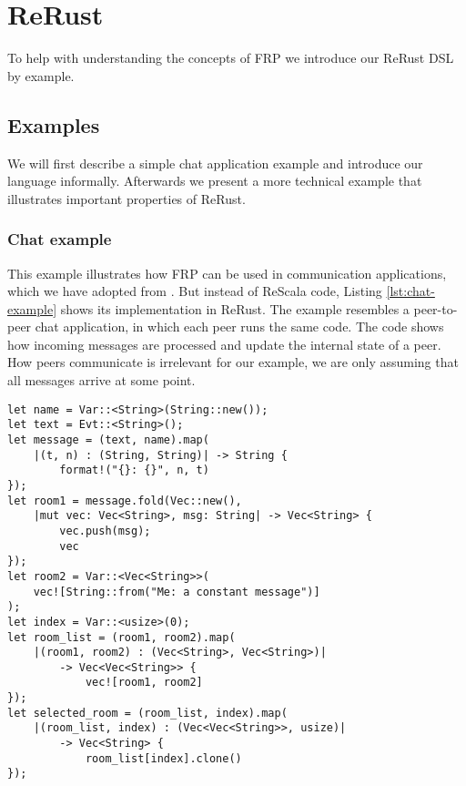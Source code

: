 \chapter{ReRust}
\label{rerust}

To help with understanding the concepts of \ac{FRP} we introduce our \textsf{ReRust} \ac{DSL} by example.

\section{Examples}
We will first describe a simple chat application example and introduce our language informally. Afterwards we present a more technical example that illustrates important properties of \textsf{ReRust}.

\subsection{Chat example}
\label{rerust:ex:chat}
This example illustrates how \ac{FRP} can be used in communication applications, which we have adopted from \cite{ChatExamplePaper}. But instead of \textsf{ReScala} code, Listing \ref{lst:chat-example} shows its implementation in \textsf{ReRust}. The example resembles a peer-to-peer chat application, in which each peer runs the same code. The code shows how incoming messages are processed and update the internal state of a peer.
How peers communicate is irrelevant for our example, we are only assuming that all messages arrive at some point. 

\begin{lstlisting}[language=ReRust,style=colouredRust,caption=Chat example written in ReRust,label=lst:chat-example]
let name = Var::<String>(String::new());
let text = Evt::<String>();
let message = (text, name).map(
    |(t, n) : (String, String)| -> String {
        format!("{}: {}", n, t)
});
let room1 = message.fold(Vec::new(),
    |mut vec: Vec<String>, msg: String| -> Vec<String> {
        vec.push(msg);
        vec
});
let room2 = Var::<Vec<String>>(
    vec![String::from("Me: a constant message")]
);
let index = Var::<usize>(0);
let room_list = (room1, room2).map(
    |(room1, room2) : (Vec<String>, Vec<String>)| 
        -> Vec<Vec<String>> {
            vec![room1, room2]
});
let selected_room = (room_list, index).map(
    |(room_list, index) : (Vec<Vec<String>>, usize)|
        -> Vec<String> {
            room_list[index].clone()
});
\end{lstlisting}

